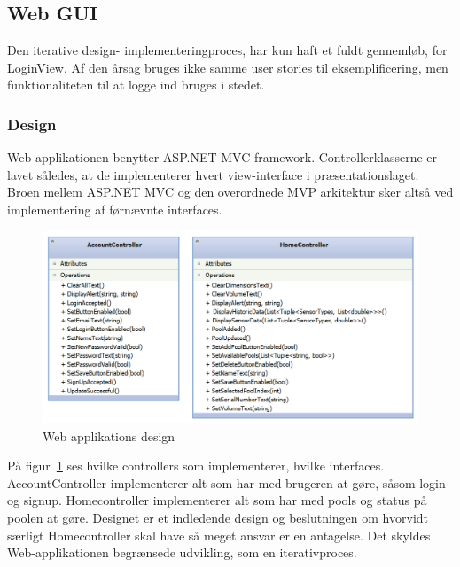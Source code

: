 \subsection{Web GUI}
Den iterative design- implementeringproces, har kun haft et fuldt gennemløb, for LoginView. Af den årsag bruges ikke samme user stories til eksemplificering, men funktionaliteten til at logge ind bruges i stedet.

\subsubsection{Design}
Web-applikationen benytter ASP.NET MVC framework. Controllerklasserne er lavet således, at de implementerer hvert view-interface i præsentationslaget. Broen mellem ASP.NET MVC og den overordnede MVP arkitektur sker altså ved implementering af førnævnte interfaces.
\begin{figure}
	\centering
	\includegraphics[width=0.9\linewidth]{figs/design/application_web}
	\caption{Web applikations design}
	\label{fig:web_class}
\end{figure}

På figur~\ref{fig:web_class} ses hvilke controllers som implementerer, hvilke interfaces. AccountController implementerer alt som har med brugeren at gøre, såsom login og signup. Homecontroller implementerer alt som har med pools og status på poolen at gøre. Designet er et indledende design og beslutningen om hvorvidt særligt Homecontroller skal have så meget ansvar er en antagelse. Det skyldes Web-applikationen begrænsede udvikling, som en iterativproces. 

